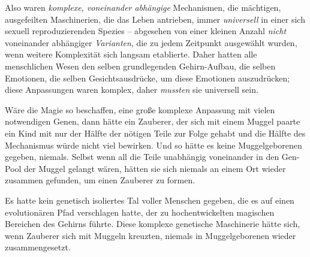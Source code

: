 Also waren \emph{komplexe, voneinander abhängige} Mechanismen, die mächtigen, ausgefeilten Maschinerien, die das Leben antrieben, immer \emph{universell} in einer sich sexuell reproduzierenden Spezies -- abgesehen von einer kleinen Anzahl \emph{nicht} voneinander abhängiger \emph{Varianten}, die zu jedem Zeitpunkt ausgewählt wurden, wenn weitere Komplexität sich langsam etablierte. Daher hatten alle menschlichen Wesen den selben grundlegenden Gehirn-Aufbau, die selben Emotionen, die selben Gesichtsausdrücke, um diese Emotionen auszudrücken; diese Anpassungen waren komplex, daher \emph{mussten} sie universell sein.

Wäre die Magie so beschaffen, eine große komplexe Anpassung mit vielen notwendigen Genen, dann hätte ein Zauberer, der sich mit einem Muggel paarte ein Kind mit nur der Hälfte der nötigen Teile zur Folge gehabt und die Hälfte des Mechanismus würde nicht viel bewirken. Und so hätte es keine Muggelgeborenen gegeben, niemals. Selbst wenn all die Teile unabhängig voneinander in den Gen-Pool der Muggel gelangt wären, hätten sie sich niemals an einem Ort wieder zusammen gefunden, um einen Zauberer zu formen.

Es hatte kein genetisch isoliertes Tal voller Menschen gegeben, die es auf einen evolutionären Pfad verschlagen hatte, der zu hochentwickelten magischen Bereichen des Gehirns führte. Diese komplexe genetische Maschinerie hätte sich, wenn Zauberer sich mit Muggeln kreuzten, niemals in Muggelgeborenen wieder zusammengesetzt.

